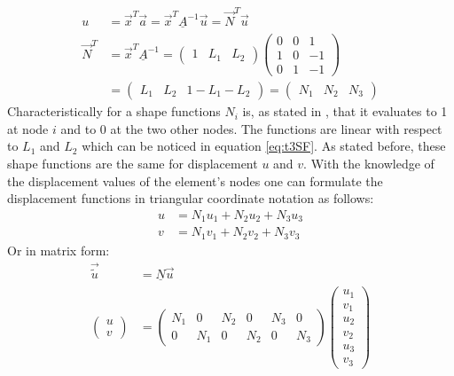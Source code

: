  \begin{align}\label{eq:t3SF}
  u &= \vec{x}^T \vec{a} = \vec{x}^T \underline{A}^{-1}\vec{u} = \vec{N}^T\vec{u} \nonumber\\
  \vec{N}^T &= \vec{x}^T \underline{A}^{-1} =
  \begin{pmatrix}
  1 & L_1 & L_2
  \end{pmatrix} \begin{pmatrix}
  0 & 0 & 1\\
  1 & 0 & -1\\
  0 & 1 & -1
  \end{pmatrix} \nonumber\\
  &= \begin{pmatrix}
  L_1 & L_2 & 1-L_1-L_2
  \end{pmatrix} = \begin{pmatrix}
  N_1 & N_2 & N_3
  \end{pmatrix}
  \end{align}
  Characteristically for a shape functions $N_i$ is, as stated in \cite{steinke2005finite}, that it evaluates to 1 at node $i$ and to 0 at the two other nodes. The functions are linear with respect to $L_1$ and $L_2$ which can be noticed in equation \eqref{eq:t3SF}. As stated before, these shape functions are the same for displacement $u$ and $v$. With the knowledge of the displacement values of the element's nodes one can formulate the displacement functions in triangular coordinate notation as follows:
  \begin{align}
  u &= N_1 u_1 + N_2 u_2 + N_3 u_3 \nonumber\\
  v &= N_1 v_1 + N_2 v_2 + N_3 v_3
  \end{align}
  Or in matrix form:
  \begin{align} \label{eq:t3u=Nu}
  \vec{\tilde{u}} &= \underline{N} \vec{u} \nonumber\\
  \begin{pmatrix}
  u \\ v
  \end{pmatrix} &= \begin{pmatrix}
  N_1 & 0 & N_2 & 0 & N_3 & 0 \\
  0 & N_1 & 0 & N_2 & 0 & N_3
  \end{pmatrix} \begin{pmatrix}
  u_1 \\ v_1 \\ u_2 \\ v_2 \\ u_3 \\ v_3
  \end{pmatrix}
  \end{align}
